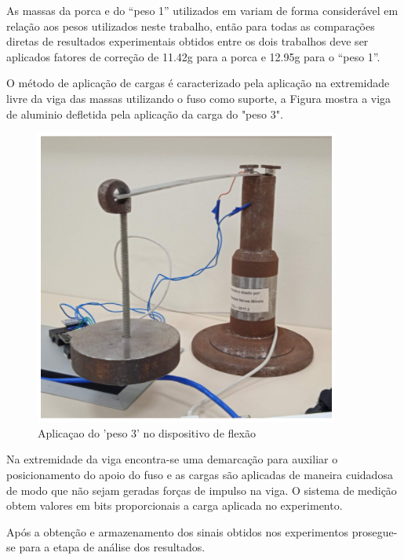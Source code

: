 As massas da porca e do “peso 1” utilizados em \autocite{Minela2017} variam de forma considerável em relação aos pesos utilizados neste trabalho, então para todas as comparações diretas de
resultados experimentais obtidos entre os dois trabalhos deve ser aplicados fatores de correção de 11.42g para a porca e 12.95g para o “peso 1”.

O método de aplicação de cargas é caracterizado pela aplicação na extremidade livre da viga das massas utilizando o fuso como suporte, a Figura mostra a viga de aluminio defletida pela aplicação da carga do "peso 3".

\begin{figure}[htb]
	\caption{\label{fig:2080} Aplicaçao do 'peso 3' no dispositivo de flexão}
	\begin{center}
		\includegraphics[width=\textwidth]{pictures/2080.png}
	\end{center}
\end{figure}

Na extremidade da viga encontra-se uma demarcação para auxiliar o posicionamento do apoio do fuso e as cargas são aplicadas de maneira cuidadosa de modo que não sejam geradas forças de impulso na viga.
O sistema de medição obtem valores em bits proporcionais a carga aplicada no experimento.

Após a obtenção e armazenamento dos sinais obtidos nos experimentos prosegue-se para a etapa de análise dos resultados.
